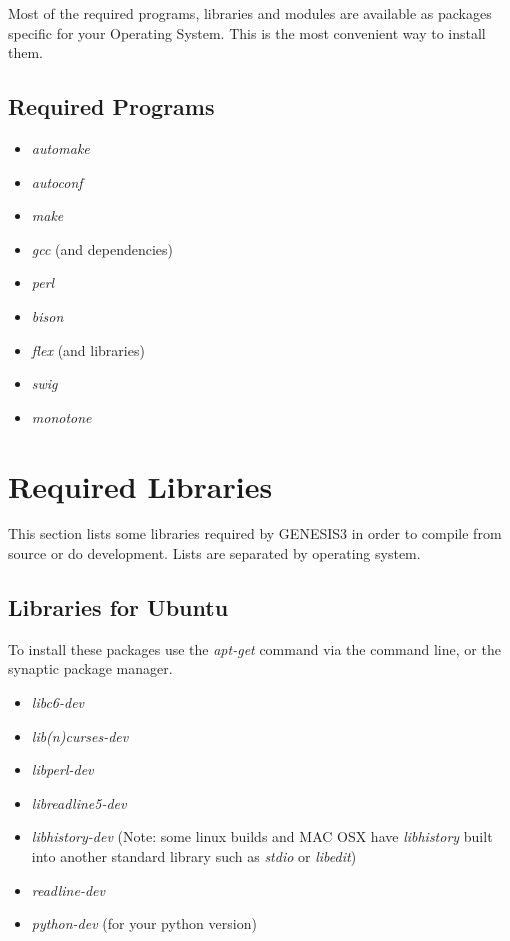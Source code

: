 \documentclass[12pt]{article}
\begin{document}
Most of the required programs, libraries and modules are available as
packages specific for your Operating System.  This is the most convenient way to install them.

\subsection*{Required Programs}

\begin{itemize}
\item {\it automake}
\item {\it autoconf}
\item {\it make}
\item {\it gcc} (and dependencies)
\item {\it perl}
\item {\it bison}
\item {\it flex} (and libraries)
\item {\it swig}
\item {\it monotone}
\end{itemize} 

\section*{Required Libraries}

This section lists some libraries required by GENESIS3 in order to compile from source or do development. Lists are separated by operating system. 

\subsection*{Libraries for Ubuntu}

To install these packages use the {\it apt-get} command via the command line, or the synaptic package manager. 

\begin{itemize}
\item {\it libc6-dev}
\item {\it lib(n)curses-dev}
\item {\it libperl-dev}
\item {\it libreadline5-dev}
\item {\it libhistory-dev} (Note: some linux builds and MAC OSX have
  {\it libhistory} built into another standard library such as {\it
    stdio} or {\it libedit})
\item {\it readline-dev}
\item {\it python-dev} (for your python version)
\end{itemize} 
\end{document}
